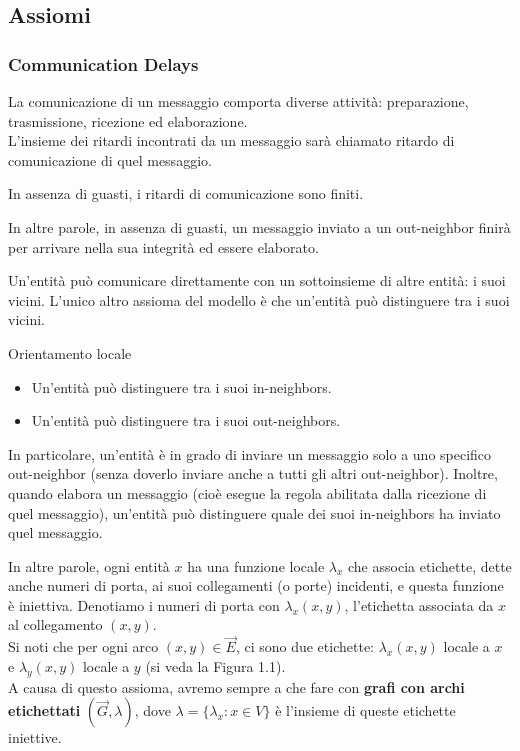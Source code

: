\subsection{Assiomi}
\subsubsection{Communication Delays}
La comunicazione di un messaggio comporta diverse attività: preparazione,
trasmissione, ricezione ed elaborazione.\\
L'insieme dei ritardi incontrati da un messaggio sarà chiamato ritardo di
comunicazione di quel messaggio.

\begin{axch}
    In assenza di guasti, i ritardi di comunicazione sono finiti.
\end{axch}

In altre parole, in assenza di guasti, un messaggio inviato a un out-neighbor
finirà per arrivare nella sua integrità ed essere elaborato.

\begin{axch}\label{axch:local-orientation}
    Un'entità può comunicare direttamente con un sottoinsieme di altre entità: i
    suoi vicini. L'unico altro assioma del modello è che un'entità può distinguere
    tra i suoi vicini.
\end{axch}

\begin{axch}
    Orientamento locale

    \begin{itemize}
        \item Un'entità può distinguere tra i suoi in-neighbors.
        \item Un'entità può distinguere tra i suoi out-neighbors.
    \end{itemize}
\end{axch}

In particolare, un'entità è in grado di inviare un messaggio solo a uno
specifico out-neighbor (senza doverlo inviare anche a tutti gli altri
out-neighbor). Inoltre, quando elabora un messaggio (cioè esegue la regola
abilitata dalla ricezione di quel messaggio), un'entità può distinguere quale
dei suoi in-neighbors ha inviato quel messaggio.

In altre parole, ogni entità $x$ ha una funzione locale $\lambda_x$ che associa
etichette, dette anche numeri di porta, ai suoi collegamenti (o porte)
incidenti, e questa funzione è iniettiva. Denotiamo i numeri di porta con
$\lambda_x (x, y)$, l'etichetta associata da $x$ al collegamento $(x, y)$.\\
Si noti che per ogni arco $(x, y) \in \overrightarrow{E}$, ci sono due
etichette: $\lambda_x (x, y)$ locale a $x$ e $\lambda_y (x, y)$ locale a $y$ (si
veda la Figura 1.1).\\
A causa di questo assioma, avremo sempre a che fare con \textbf{grafi con archi
    etichettati} $(\overrightarrow{G}, \lambda)$, dove $\lambda = \{\lambda_x : x \in
    V \}$ è l'insieme di queste etichette iniettive.

